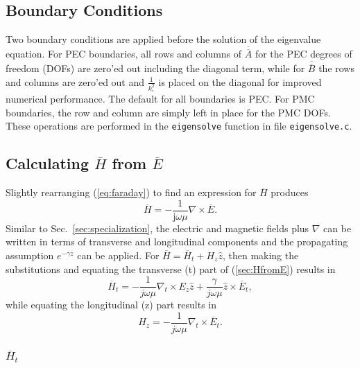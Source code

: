 \documentclass[titlepage]{article}
\renewcommand\_{\textunderscore\linebreak[1]}
\begin{document}
\subsection{Boundary Conditions}

Two boundary conditions are applied before the solution of the eigenvalue equation.  For PEC boundaries, all rows and columns of $\overline{\overline{A}}$ for the PEC degrees of freedom (DOFs) are zero'ed out including the diagonal term, while for $\overline{\overline{B}}$ the rows and columns are zero'ed out and $\frac{1}{k_{\circ}^2}$ is placed on the diagonal for improved numerical performance.  The default for all boundaries is PEC.  For PMC boundaries, the row and column are simply left in place for the PMC DOFs. These operations are performed in the \texttt{eigensolve} function in file \texttt{eigensolve.c}.

\subsection{Calculating $\overline{H}$ from $\overline{E}$}

Slightly rearranging (\ref{eq:faraday}) to find an expression for $\overline{H}$ produces
\begin{equation}
\label{sec:HfromE}
\overline{H}=-\frac{1}{\text{j}\omega\mu}\nabla\times\overline{E}.
\end{equation}
Similar to Sec.~\ref{sec:specialization}, the electric and magnetic fields plus $\nabla$ can be written in terms of transverse and longitudinal components and the propagating assumption $e^{-\gamma z}$ can be applied.  For $\overline{H}=\overline{H}_t+H_z\hat{z}$, then making the substitutions and equating the transverse (t) part of (\ref{sec:HfromE}) results in
\begin{equation}
\label{eq:Ht1}
\overline{H}_t=-\frac{1}{j\omega\mu}\nabla_t\times E_z\hat{z}+\frac{\gamma}{j\omega\mu}\hat{z}\times\overline{E}_t,
\end{equation}
while equating the longitudinal (z) part results in
\begin{equation}
\label{eq:Hz1}
H_z=-\frac{1}{j\omega\mu}\nabla_t \times\overline{E}_t.
\end{equation}

\subsubsection{$\overline{H}_t$}
\end{document}
